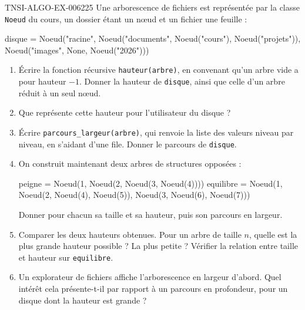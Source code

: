 \begin{exercice}{TNSI-ALGO-EX-006}{2}{25}
Une arborescence de fichiers est représentée par la classe \lstinline{Noeud} du
cours, un dossier étant un n\oe{}ud et un fichier une feuille :
\begin{python}
disque = Noeud("racine",
               Noeud("documents", Noeud("cours"), Noeud("projets")),
               Noeud("images", None, Noeud("2026")))
\end{python}
\begin{enumerate}
  \item Écrire la fonction récursive \lstinline{hauteur(arbre)}, en convenant
    qu'un arbre vide a pour hauteur $-1$. Donner la hauteur de
    \lstinline{disque}, ainsi que celle d'un arbre réduit à un seul n\oe{}ud.
  \item Que représente cette hauteur pour l'utilisateur du disque ?
  \item Écrire \lstinline{parcours_largeur(arbre)}, qui renvoie la liste des
    valeurs niveau par niveau, en s'aidant d'une file. Donner le parcours de
    \lstinline{disque}.
  \item On construit maintenant deux arbres de structures opposées :
    \begin{python}
peigne = Noeud(1, Noeud(2, Noeud(3, Noeud(4))))
equilibre = Noeud(1, Noeud(2, Noeud(4), Noeud(5)), Noeud(3, Noeud(6), Noeud(7)))
    \end{python}
    Donner pour chacun sa taille et sa hauteur, puis son parcours en largeur.
  \item Comparer les deux hauteurs obtenues. Pour un arbre de taille $n$, quelle
    est la plus grande hauteur possible ? La plus petite ? Vérifier la relation
    entre taille et hauteur sur \lstinline{equilibre}.
  \item Un explorateur de fichiers affiche l'arborescence en largeur d'abord.
    Quel intérêt cela présente-t-il par rapport à un parcours en profondeur,
    pour un disque dont la hauteur est grande ?
\end{enumerate}
\end{exercice}
